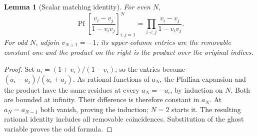 \documentclass[11pt]{article}
\numberwithin{equation}{section}
\newtheorem{lemma}[theorem]{Lemma}
\theoremstyle{definition}
\begin{document}
\begin{lemma}[Scalar matching identity]\label{ana:schur-identity}
For even $N$,
\[
 \operatorname{Pf}\left[\frac{v_i-v_j}{1-v_iv_j}\right]_{i,j=1}^N
       =\prod_{i<j}\frac{v_i-v_j}{1-v_iv_j}.
\]
For odd $N$, adjoin $v_{N+1}=-1$; its upper-column entries are
the removable constant one and the product on the right is the
product over the original indices.
\end{lemma}
\begin{proof}
Set $a_i=(1+v_i)/(1-v_i)$, so the entries become
$(a_i-a_j)/(a_i+a_j)$. As rational functions of $a_N$, the
Pfaffian expansion and the product have the same residues at every
$a_N=-a_i$, by induction on $N$. Both are bounded at infinity.
Their difference is therefore constant in $a_N$. At
$a_N=a_{N-1}$ both vanish, proving the induction; $N=2$ starts it.
The resulting rational identity includes all removable coincidences.
Substitution of the ghost variable proves the odd formula.
\end{proof}
\end{document}
